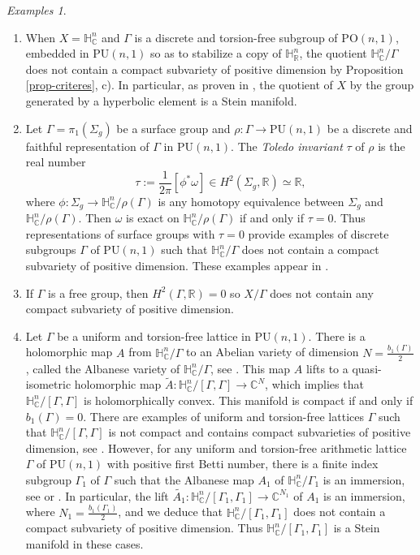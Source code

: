 \documentclass{article}
\theoremstyle{definition}
\theoremstyle{remark}
\newtheorem*{examples}{Examples}
\newcommand{\C}{\mathbb{C}}
\newcommand{\R}{\mathbb{R}}
\newcommand{\HNC}{\mathbb{H}^{n}_{\C}}
\newcommand{\HNR}{\mathbb{H}^{n}_{\R}}
\newcommand{\PU}{\mathrm{PU}}
\newcommand{\PO}{\mathrm{PO}}
\begin{document}
	\begin{examples}\begin{enumerate}
			\item When $X=\HNC$ and $\Gamma$ is a discrete and torsion-free subgroup of $\PO(n,1)$, embedded in $\PU(n,1)$ so as to stabilize a copy of $\HNR$, the quotient $\HNC/\Gamma$ does not contain a compact subvariety of positive dimension by Proposition \ref{prop-criteres}, c). In particular, as proven in \cite{chenDiscreteGroupsHolomorphic2013}, the quotient of $X$ by the group generated by a hyperbolic element is a Stein manifold.
			\item Let $\Gamma=\pi_1(\Sigma_g)$ be a surface group and $\rho:\Gamma \to \PU(n,1)$ be a discrete and faithful representation of $\Gamma$ in $\PU(n,1)$. The \textit{Toledo invariant} $\tau$ of $\rho$ is the real number \begin{equation*}
				\tau := \frac{1}{2\pi}[\phi^{*}\omega] \in H^{2}(\Sigma_g,\R) \simeq \R,
			\end{equation*}
			where $\phi : \Sigma_g \to \HNC/\rho(\Gamma)$ is any homotopy equivalence between $\Sigma_g$ and $\HNC/\rho(\Gamma)$. Then $\omega$ is exact on $\HNC/\rho(\Gamma)$ if and only if $\tau=0$. Thus representations of surface groups with $\tau=0$ provide examples of discrete subgroups $\Gamma$ of $\PU(n,1)$ such that $\HNC/\Gamma$ does not contain a compact subvariety of positive dimension. These examples appear in \cite[page 27]{kapovichSurveyComplexHyperbolic2022}.
			\item If $\Gamma$ is a free group, then $H^{2}(\Gamma,\R)=0$ so $X/\Gamma$ does not contain any compact subvariety of positive dimension.
			\item Let $\Gamma$ be a uniform and torsion-free lattice in $\PU(n,1)$. There is a holomorphic map  $A$ from $\HNC/\Gamma$ to an Abelian variety of dimension $N=\frac{b_1(\Gamma)}{2}$, called the Albanese variety of $\HNC/\Gamma$, see \cite[chapter 12]{voisinTheorieHodgeGeometrie2002}. This map $A$ lifts to a quasi-isometric holomorphic map $\widetilde{A}: \HNC/[\Gamma,\Gamma] \to \C^{N}$, which implies that $\HNC/[\Gamma,\Gamma]$ is holomorphically convex. This manifold is compact if and only if $b_1(\Gamma)=0$. There are examples of uniform and torsion-free lattices $\Gamma$ such that $\HNC/[\Gamma,\Gamma]$ is not compact and contains compact subvarieties of positive dimension, see \cite{cartwrightCartwrightStegerSurface2017}. However, for any uniform and torsion-free arithmetic lattice $\Gamma$ of $\PU(n,1)$ with positive first Betti number, there is a finite index subgroup $\Gamma_1$ of $\Gamma$ such that the Albanese map $A_1$ of $\HNC/\Gamma_1$ is an immersion, see \cite[Section 3.1]{llosaisenrichSubgroupsHyperbolicGroups2024} or \cite{eyssidieuxOrbifoldKahlerGroups2018}. In particular, the lift $\widetilde{A_1}:\HNC/[\Gamma_1,\Gamma_1] \to \C^{N_1}$ of $A_1$ is an immersion, where $N_1=\frac{b_1(\Gamma_1)}{2}$, and we deduce that $\HNC/[\Gamma_1,\Gamma_1]$ does not contain a compact subvariety of positive dimension. Thus $\HNC/[\Gamma_1,\Gamma_1]$ is a Stein manifold in these cases.
		\end{enumerate}
		
	\end{examples}
	
\end{document}
